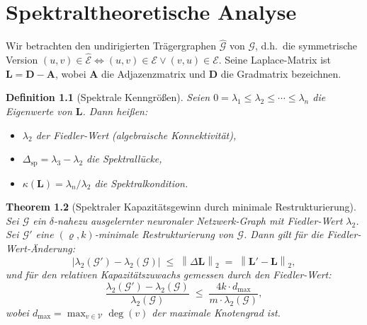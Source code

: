 ﻿\documentclass[12pt, a4paper, openany]{report}
\newtheorem{theorem}{Theorem}[chapter]
\newtheorem{definition}[theorem]{Definition}
\newcommand{\calG}{\mathcal{G}}
\newcommand{\calV}{\mathcal{V}}
\newcommand{\calE}{\mathcal{E}}
\newcommand{\norms}[1]{\left\|#1\right\|}
\newcommand{\abs}[1]{\left|#1\right|}
\begin{document}
\chapter{Spektraltheoretische Analyse}
\label{sec:spectral}

Wir betrachten den undirigierten Trägergraphen $\hat{\calG}$ von $\calG$,
d.h.\ die symmetrische Version $(u,v) \in \hat{\calE} \Leftrightarrow
(u,v) \in \calE \lor (v,u) \in \calE$.  Seine Laplace-Matrix ist
$\bm{L} = \bm{D} - \bm{A}$, wobei $\bm{A}$ die Adjazenzmatrix und $\bm{D}$
die Gradmatrix bezeichnen.

\begin{definition}[Spektrale Kenngrößen]
\label{def:spectral}
Seien $0 = \lambda_1 \leq \lambda_2 \leq \cdots \leq \lambda_n$ die
Eigenwerte von $\bm{L}$.  Dann heißen:
\begin{itemize}
  \item $\lambda_2$ der \emph{Fiedler-Wert} (algebraische Konnektivität),
  \item $\Delta_{\mathrm{sp}} = \lambda_3 - \lambda_2$ die \emph{Spektrallücke},
  \item $\kappa(\bm{L}) = \lambda_n / \lambda_2$ die \emph{Spektralkondition}.
\end{itemize}
\end{definition}

\begin{theorem}[Spektraler Kapazitätsgewinn durch minimale Restrukturierung]
\label{thm:spectral}
Sei $\calG$ ein $\delta$-nahezu ausgelernter neuronaler Netzwerk-Graph mit
Fiedler-Wert $\lambda_2$.  Sei $\calG'$ eine $(\varrho, k)$-minimale
Restrukturierung von $\calG$.  Dann gilt für die Fiedler-Wert-Änderung:
\begin{equation}
  \label{eq:fiedler_bound}
  \abs{\lambda_2(\calG') - \lambda_2(\calG)} \;\leq\;
  \norms{\Delta \bm{L}}_2 \;=\; \norms{\bm{L}' - \bm{L}}_2,
\end{equation}
und für den relativen Kapazitätszuwachs gemessen durch den Fiedler-Wert:
\begin{equation}
  \label{eq:fiedler_relative}
  \frac{\lambda_2(\calG') - \lambda_2(\calG)}{\lambda_2(\calG)}
  \;\leq\;
  \frac{4k \cdot d_{\max}}{m \cdot \lambda_2(\calG)},
\end{equation}
wobei $d_{\max} = \max_{v \in \calV} \deg(v)$ der maximale Knotengrad ist.
\end{theorem}
\end{document}
